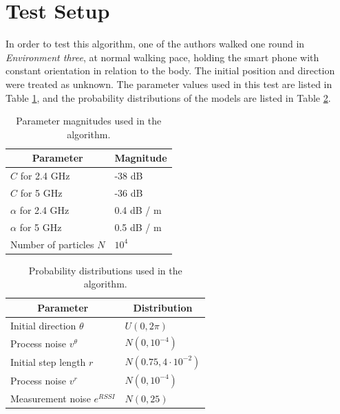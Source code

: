 \documentclass{LTHthesis}
\begin{document}
\section{Test Setup}

In order to test this algorithm, one of the authors walked one round in \emph{Environment three}, at normal walking pace, holding the smart phone with constant orientation in relation to the body. The initial position and direction were treated as unknown. The parameter values used in this test are listed in Table \ref{table:parameters_careful_user_test}, and the probability distributions of the models are listed in Table \ref{table:parameter_distributions}.

\begin{table}[!hbt]
\begin{center}
\begin{tabular}{|l|l|}
\hline
\multicolumn{1}{|c|}{Parameter} & \multicolumn{1}{c|}{Magnitude} \\
\hline
\hline
$C$ for 2.4 GHz & -38 dB \\
\hline
$C$ for 5 GHz & 	-36 dB\\
\hline
$\alpha$ for 2.4 GHz & 0.4 dB / m \\
\hline
$\alpha$ for 5 GHz & 0.5 dB / m \\
\hline 
Number of particles $N$ & $10^4$ \\
\hline 


\end{tabular}
\end{center}
\caption{Parameter magnitudes used in the algorithm.}\label{table:parameters_careful_user_test}
\end{table}


\begin{table}[!hbt]
\begin{center}
\begin{tabular}{|l|l|}
\hline
\multicolumn{1}{|c|}{Parameter} & \multicolumn{1}{c|}{Distribution} \\
\hline
\hline
Initial direction $\theta$ & $U(0,2\pi)$ \\
\hline
Process noise $v ^\theta$ & $N(0,10^{-4})$ \\
\hline
Initial step length $r$ & $N(0.75, 4 \cdot 10^{-2})$ \\
\hline
Process noise $v^r$ & $N(0,10^{-4})$ \\
\hline
Measurement noise $e^{RSSI}$ & $N(0,25)$ \\
\hline


\end{tabular}
\end{center}
\caption{Probability distributions used in the algorithm.}\label{table:parameter_distributions}
\end{table}
\end{document}
